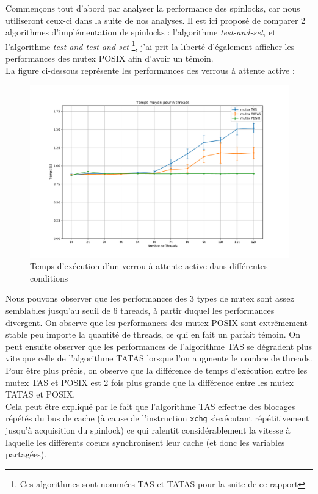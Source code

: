 Commençons tout d'abord par analyser la performance des spinlocks, car nous utiliseront ceux-ci dans la suite de nos analyses. Il est ici proposé de comparer
2 algorithmes d'implémentation de spinlocks : l'algorithme \textit{test-and-set}, et l'algorithme \textit{test-and-test-and-set} \footnote{Ces algorithmes sont nommées TAS et TATAS pour la suite de ce rapport}, j'ai prit la liberté d'également afficher les performances des mutex POSIX afin d'avoir un témoin. \\

La figure ci-dessous représente les performances des verrous à attente active :
\begin{figure}[h!]
    \centering
    \includegraphics[scale=0.4]{img/spinlock.pdf}
    \caption{Temps d'exécution d'un verrou à attente active dans différentes conditions}
    \label{pic:spinlock}
\end{figure}

\noindent Nous pouvons observer que les performances des 3 types de mutex sont assez semblables jusqu'au seuil de 6 threads, à partir duquel les performances divergent. On observe que les performances des mutex POSIX sont extrêmement stable peu importe la quantité de threads, ce qui en fait un parfait témoin.
On peut ensuite observer que les performances de l'algorithme TAS se dégradent plus vite que celle de l'algorithme TATAS lorsque l'on augmente le nombre de threads. Pour être plus précis, on observe que la différence de temps d'exécution entre les mutex TAS et POSIX est 2 fois plus grande que la différence entre les mutex TATAS et POSIX. \\

\noindent Cela peut être expliqué par le fait que l'algorithme TAS effectue des blocages répétés du bus de cache (à cause de l'instruction \texttt{xchg} s'exécutant répétitivement jusqu'à acquisition du spinlock) ce qui ralentit considérablement la vitesse à laquelle les différents coeurs synchronisent leur cache (et donc les variables partagées).

